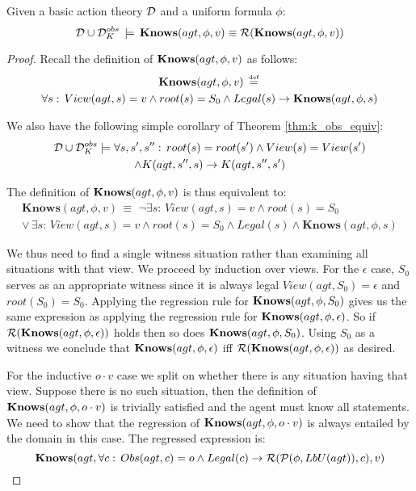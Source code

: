 \begin{thmext}
[\ref{thm:Reg_KnowsO}] Given a basic action theory $\mathcal{D}$
and a uniform formula $\phi$:\[
\mathcal{D}\cup\mathcal{D}_{K}^{obs}\,\models\,\mathbf{Knows}(agt,\phi,v)\equiv\mathcal{R}(\mathbf{Knows}(agt,\phi,v))\]

\end{thmext}
\begin{proof}
Recall the definition of $\mathbf{Knows}(agt,\phi,v)$ as follows:\begin{multline*}
\mathbf{Knows}(agt,\phi,v)\,\stackrel{\mbox{\tiny def}}{=}\,\\
\forall s:\, View(agt,s)=v\wedge root(s)=S_{0}\wedge Legal(s)\rightarrow\mathbf{Knows}(agt,\phi,s)\end{multline*}


We also have the following simple corollary of Theorem \ref{thm:k_obs_equiv}:\begin{multline*}
\mathcal{D}\cup\mathcal{D}_{K}^{obs}\models\forall s,s',s'':\, root(s)=root(s')\wedge View(s)=View(s')\\
\wedge K(agt,s'',s)\rightarrow K(agt,s'',s')\end{multline*}


The definition of $\mathbf{Knows}(agt,\phi,v)$ is thus equivalent to:\begin{multline*}
\mathbf{Knows}(agt,\phi,v)\,\equiv\,\,\neg\exists s:\, View(agt,s)=v\wedge root(s)=S_{0}\\
\vee\,\exists s:\, View(agt,s)=v\wedge root(s)=S_{0}\wedge Legal(s)\wedge\mathbf{Knows}(agt,\phi,s)\end{multline*}


We thus need to find a single witness situation rather than examining
all situations with that view. We proceed by induction over views.
For the $\epsilon$ case, $S_{0}$ serves as an appropriate witness
since it is always legal $View(agt,S_{0})=\epsilon$ and $root(S_{0})=S_{0}$.
Applying the regression rule for $\mathbf{Knows}(agt,\phi,S_{0})$ gives us
the same expression as applying the regression rule for $\mathbf{Knows}(agt,\phi,\epsilon)$.
So if $\mathcal{R}(\mathbf{Knows}(agt,\phi,\epsilon))$ holds then so does $\mathbf{Knows}(agt,\phi,S_{0})$.
Using $S_{0}$ as a witness we conclude that $\mathbf{Knows}(agt,\phi,\epsilon)$
iff $\mathcal{R}(\mathbf{Knows}(agt,\phi,\epsilon))$ as desired.

For the inductive $o\cdot v$ case we split on whether there is any
situation having that view. Suppose there is no such situation, then
the definition of $\mathbf{Knows}(agt,\phi,o\cdot v)$ is trivially satisfied
and the agent must know all statements. We need to show that the regression
of $\mathbf{Knows}(agt,\phi,o\cdot v)$ is always entailed by the domain in
this case. The regressed expression is:\[
\mathbf{Knows}(agt,\forall c:\, Obs(agt,c)=o\wedge Legal(c)\rightarrow\mathcal{R}(\mathcal{P}(\phi,LbU(agt)),c),v)\]



\end{proof}
